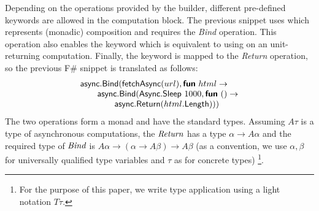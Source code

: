 \documentclass[runningheads,a4paper]{llncs}
\begin{document}
Depending on the operations provided by the builder, different pre-defined keywords are allowed
in the computation block. The previous snippet uses  which represents (monadic) 
composition and requires the \emph{Bind} operation. This operation also enables the  
keyword which is equivalent to using  on an unit-returning computation. Finally, the 
 keyword is mapped to the \emph{Return} operation, so the previous F\# snippet is 
translated as follows:
%
\begin{equation*}
\begin{array}{l}
\textnormal{\sffamily async}.\textnormal{\sffamily Bind}(\textnormal{\sffamily fetchAsync}(url), \textnormal{\bfseries\sffamily fun}~html\rightarrow\\
\qquad \textnormal{\sffamily async}.\textnormal{\sffamily Bind}(\textnormal{\sffamily Async}.\textnormal{\sffamily Sleep}~1000, \textnormal{\bfseries\sffamily fun}~()\rightarrow\\
\qquad\qquad \textnormal{\sffamily async}.\textnormal{\sffamily Return}(html.\textnormal{\sffamily Length})))
\end{array}
\end{equation*}
%
The two operations form a monad and have the standard types. Assuming $A\tau$ is a type of asynchronous 
computations, the $\emph{Return}$ has a type $\alpha \rightarrow A\alpha$ and the required type of
$\emph{Bind}$ is $A\alpha \rightarrow (\alpha \rightarrow A\beta) \rightarrow A\beta$ (as a convention,
we use $\alpha, \beta$ for universally qualified type variables and $\tau$ as for concrete types)
\footnote{For the purpose of this paper, we write type application using a light notation $T\tau$. }.

\vspace{-1em}
\end{document}
